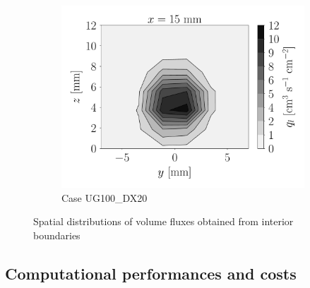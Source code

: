 \begin{figure}[ht]
\begin{subfigure}[b]{1.1\textwidth}
   \includegraphics[scale=0.225]{./part2_developments/figures_ch5_resolved_JICF/flow_rates_ibs/spatial_maps/UG100_DX20_x15mm_volume_flux}
   \vspace*{-0.1in}
	\caption{Case UG100\_DX20}
\end{subfigure}


   \caption{Spatial distributions of volume fluxes obtained from interior boundaries}
\label{fig:ibs_spatial_distributions}
\end{figure}

\clearpage

\subsection{Computational performances and costs}
\label{subsec:ch5_computational_performances}

